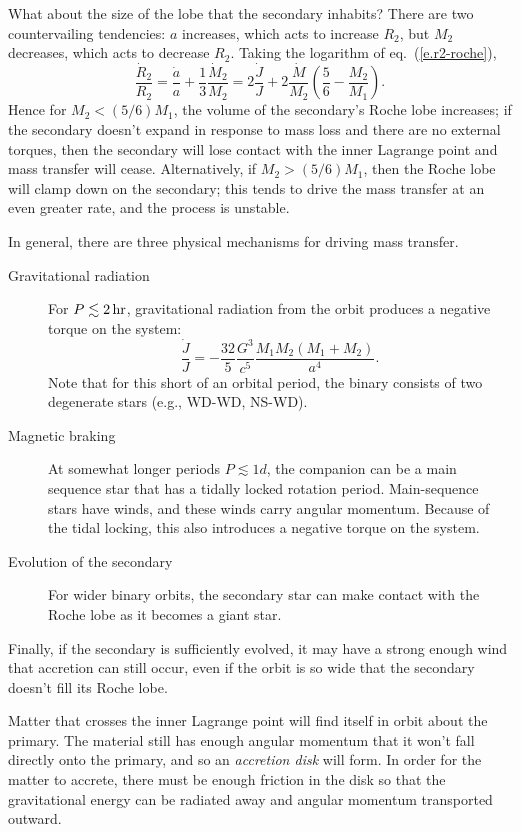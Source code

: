 What about the size of the lobe that the secondary inhabits?  There are two countervailing tendencies: $a$ increases, which acts to increase $R_{2}$, but $M_{2}$ decreases, which acts to decrease $R_{2}$.  Taking the logarithm of eq.~(\ref{e.r2-roche}),
\begin{equation}\label{e.r2dot}
\frac{\dot{R}_{2}}{R_{2}} = \frac{\dot{a}}{a} + \frac{1}{3}\frac{\dot{M}_{2}}{M_{2}} = 2\frac{\dot{J}}{J} + 2\frac{\dot{M}}{M_{2}} \left(\frac{5}{6} - \frac{M_{2}}{M_{1}}\right).
\end{equation}
Hence for $M_{2} < (5/6) M_{1}$, the volume of the secondary's Roche lobe increases; if the secondary doesn't expand in response to mass loss and there are no external torques, then the secondary will lose contact with the inner Lagrange point and mass transfer will cease.  Alternatively, if $M_{2} > (5/6) M_{1}$, then the Roche lobe will clamp down on the secondary; this tends to drive the mass transfer at an even greater rate, and the process is unstable.

In general, there are three physical mechanisms for driving mass transfer.
\begin{description}
\item[Gravitational radiation] For $P \lesssim 2\,\mathrm{hr}$, gravitational radiation from the orbit produces a negative torque on the system:
\begin{equation}\label{e.GR-torque}
\frac{\dot{J}}{J} = -\frac{32}{5}\frac{G^{3}}{c^{5}}\frac{M_{1}M_{2}(M_{1}+M_{2})}{a^{4}}.
\end{equation}
Note that for this short of an orbital period, the binary consists of two degenerate stars (e.g., WD-WD, NS-WD).
\item[Magnetic braking] At somewhat longer periods $P \lesssim \unit{1}{d}$, the companion can be a main sequence star that has a tidally locked rotation period.  Main-sequence stars have winds, and these winds carry angular momentum.  Because of the tidal locking, this also introduces a negative torque on the system.
\item[Evolution of the secondary] For wider binary orbits, the secondary star can make contact with the Roche lobe as it becomes a giant star.
\end{description}
Finally, if the secondary is sufficiently evolved, it may have a strong enough wind that accretion can still occur, even if the orbit is so wide that the secondary doesn't fill its Roche lobe.

Matter that crosses the inner Lagrange point will find itself in orbit about the primary.  The material still has enough angular momentum that it won't fall directly onto the primary, and so an \emph{accretion disk} will form. In order for the matter to accrete, there must be enough friction in the disk so that the gravitational energy can be radiated away and angular momentum transported outward.


